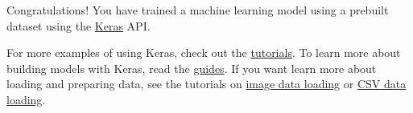 \documentclass[
  letterpaper,
  DIV=11,
  numbers=noendperiod]{scrreprt}
\begin{document}
Congratulations! You have trained a machine learning model using a
prebuilt dataset using the
\href{https://www.tensorflow.org/guide/keras/overview}{Keras} API.

For more examples of using Keras, check out the
\href{https://www.tensorflow.org/tutorials/keras/}{tutorials}. To learn
more about building models with Keras, read the
\href{https://www.tensorflow.org/guide/keras}{guides}. If you want learn
more about loading and preparing data, see the tutorials on
\href{https://www.tensorflow.org/tutorials/load_data/images}{image data
loading} or
\href{https://www.tensorflow.org/tutorials/load_data/csv}{CSV data
loading}.
\end{document}
